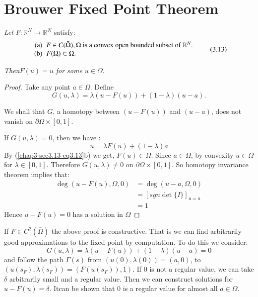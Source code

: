 \setcounter{section}{12}
\section{Brouwer Fixed Point Theorem}\label{chap3-sec3.13}%

\textit{Let} $F : \mathbb{R}^N \to \mathbb{R}^N $ satisfy:
\begin{equation*}
\begin{array}{r@{\;\;}l}
\text{(a)} & F \in C (\bar{\Omega}), \Omega
 \text{ is a convex open bounded subset of } \mathbb{R}^N.\\
\text{(b)} & F (\bar{\Omega}) \subset \Omega.
\end{array}\tag{3.13}\label{chap3-sec3.13-eq3.13}
\end{equation*}

\textit{Then\pageoriginale $F(u) = u$ for some $u \in \Omega $}.

\begin{proof}
Take any point $a \in\Omega$. Define
$$
G(u , \lambda) = \lambda (u -F (u)) + (1- \lambda) (u-a) .
$$

We shall that $G$, a homotopy between $(u -F (u))$ and  $(u-a)$, does
not vanish on $\partial \Omega \times  [0,1]$. 

If $G(u , \lambda) = 0$, then we have :
$$
u = \lambda F (u) + (1 - \lambda) a
$$
By (\ref{chap3-sec3.13-eq3.13}b) we get, $F(u) \in \Omega$. Since $a
\in\Omega$, by convexity $u\in \Omega$ for $\lambda
\in [0,1]$. Therefore $G(u , \lambda) \neq 0$ on $\partial
\Omega \times [ 0,1]$. So homotopy invariance theorem implies that:  
\begin{align*}
\deg (u-F(u), \Omega , 0 ) & = \deg (u-a, \Omega ,0) \\
& = [  sgn \det \{ I \} ]_{u=a}\\
& = 1
\end{align*}
Hence $u-F(u) = 0$ has a solution in $\Omega$
\end{proof}

\begin{note*}
If $F \in C^2  (\bar{\Omega})$ the above proof is
  constructive. That is we can find arbitrarily good approximations to
  the fixed point by computation. To do this we consider:  
$$
G(u , \lambda) = \lambda (u -F (u)) + (1- \lambda) (u-a) = 0 
$$
and follow the path $\Gamma (s) $ from $(u(0), \lambda (0)) = (a,0)$,
to $(u(s_F),\lambda (s_F)) = (F(u(s_F)),1)$. If 0 is
not a regular value, we can take $\delta$ arbitrarily small and a
regular value. Then we can construct solutions for $u-F(u) =
\delta$. It\pageoriginale can be shown that 0 is a regular value for
almost all $a \in \Omega$. 
\end{note*}

